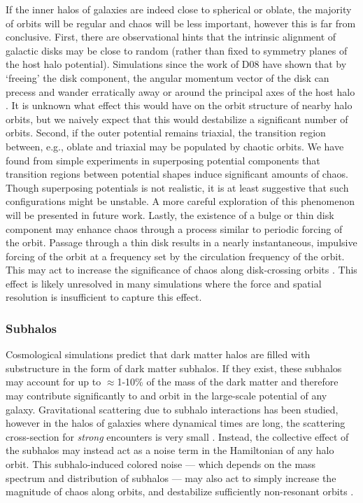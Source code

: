 \documentclass[letterpaper,12pt,preprint]{aastex}
\begin{document}
If the inner halos of galaxies are indeed close to spherical or oblate, the majority of orbits will be regular and chaos will be less important, however this is far from conclusive. First, there are observational hints that the intrinsic alignment of galactic disks may be close to random \citep{??} (rather than fixed to symmetry planes of the host halo potential). Simulations since the work of D08 have shown that by `freeing' the disk component, the angular momentum vector of the disk can precess and wander erratically away or around the principal axes of the host halo \citep{debattista15}. It is unknown what effect this would have on the orbit structure of nearby halo orbits, but we naively expect that this would destabilize a significant number of orbits. Second, if the outer potential remains triaxial, the transition region between, e.g., oblate and triaxial may be populated by chaotic orbits. We have found from simple experiments in superposing potential components that transition regions between potential shapes induce significant amounts of chaos. Though superposing potentials is not realistic, it is at least suggestive that such configurations might be unstable. A more careful exploration of this phenomenon will be presented in future work. Lastly, the existence of a bulge or thin disk component may enhance chaos through a process similar to periodic forcing of the orbit. Passage through a thin disk results in a nearly instantaneous, impulsive forcing of the orbit at a frequency set by the circulation frequency of the orbit. This may act to increase the significance of chaos along disk-crossing orbits \citep[e.g.,][]{kandrup00, hunter05}. This effect is likely unresolved in many simulations where the force and spatial resolution is insufficient to capture this effect.

\subsubsection{Subhalos}

Cosmological simulations predict that dark matter halos are filled with substructure in the form of dark matter subhalos. If they exist, these subhalos may account for up to $\approx$1-10\% of the mass of the dark matter \citep{??} and therefore may contribute significantly to and orbit in the large-scale potential of any galaxy. Gravitational scattering due to subhalo interactions has been studied, however in the halos of galaxies where dynamical times are long, the scattering cross-section for \emph{strong} encounters is very small \citep{??}. Instead, the collective effect of the subhalos may instead act as a noise term in the Hamiltonian of any halo orbit. This subhalo-induced colored noise --- which depends on the mass spectrum and distribution of subhalos --- may also act to simply increase the magnitude of chaos along orbits, and destabilize sufficiently non-resonant orbits \citep[see, e.g.,][]{kandrup00}.
\end{document}
